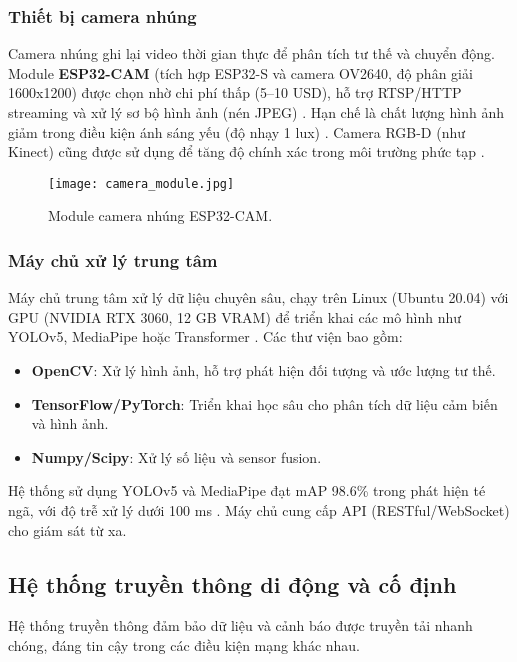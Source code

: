 \subsubsection{Thiết bị camera nhúng}
Camera nhúng ghi lại video thời gian thực để phân tích tư thế và chuyển động. Module \textbf{ESP32-CAM} (tích hợp ESP32-S và camera OV2640, độ phân giải 1600x1200) được chọn nhờ chi phí thấp (5--10 USD), hỗ trợ RTSP/HTTP streaming và xử lý sơ bộ hình ảnh (nén JPEG) \cite{esp32cam2023}. Hạn chế là chất lượng hình ảnh giảm trong điều kiện ánh sáng yếu (độ nhạy 1 lux) \cite{saraswat2024}. Camera RGB-D (như Kinect) cũng được sử dụng để tăng độ chính xác trong môi trường phức tạp \cite{liu2018}.

\begin{figure}[ht]
    \centering
    \texttt{[image: camera\_module.jpg]}
    \caption{Module camera nhúng ESP32-CAM.}
    \label{fig:esp32_cam}
\end{figure}

\subsubsection{Máy chủ xử lý trung tâm}
Máy chủ trung tâm xử lý dữ liệu chuyên sâu, chạy trên Linux (Ubuntu 20.04) với GPU (NVIDIA RTX 3060, 12 GB VRAM) để triển khai các mô hình như YOLOv5, MediaPipe hoặc Transformer \cite{han2024, stylios2024}. Các thư viện bao gồm:

\begin{itemize}
    \item \textbf{OpenCV}: Xử lý hình ảnh, hỗ trợ phát hiện đối tượng và ước lượng tư thế.
    \item \textbf{TensorFlow/PyTorch}: Triển khai học sâu cho phân tích dữ liệu cảm biến và hình ảnh.
    \item \textbf{Numpy/Scipy}: Xử lý số liệu và sensor fusion.
\end{itemize}

Hệ thống sử dụng YOLOv5 và MediaPipe đạt mAP 98.6\% trong phát hiện té ngã, với độ trễ xử lý dưới 100 ms \cite{han2024, multimodal2024}. Máy chủ cung cấp API (RESTful/WebSocket) cho giám sát từ xa.

\subsection{Hệ thống truyền thông di động và cố định}

Hệ thống truyền thông đảm bảo dữ liệu và cảnh báo được truyền tải nhanh chóng, đáng tin cậy trong các điều kiện mạng khác nhau.

